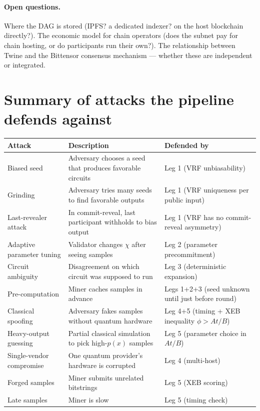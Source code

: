 \documentclass[11pt]{article}
\begin{document}
\paragraph{Open questions.} Where the DAG is stored (IPFS? a dedicated indexer? on the host blockchain directly?). The economic model for chain operators (does the subnet pay for chain hosting, or do participants run their own?). The relationship between Twine and the Bittensor consensus mechanism --- whether these are independent or integrated.

\section{Summary of attacks the pipeline defends against}

\begin{center}
\begin{tabular}{lp{4.5cm}p{6cm}}
\toprule
\textbf{Attack} & \textbf{Description} & \textbf{Defended by} \\
\midrule
Biased seed & Adversary chooses a seed that produces favorable circuits & Leg 1 (VRF unbiasability) \\
Grinding & Adversary tries many seeds to find favorable outputs & Leg 1 (VRF uniqueness per public input) \\
Last-revealer attack & In commit-reveal, last participant withholds to bias output & Leg 1 (VRF has no commit-reveal asymmetry) \\
Adaptive parameter tuning & Validator changes $\chi$ after seeing samples & Leg 2 (parameter precommitment) \\
Circuit ambiguity & Disagreement on which circuit was supposed to run & Leg 3 (deterministic expansion) \\
Pre-computation & Miner caches samples in advance & Legs 1+2+3 (seed unknown until just before round) \\
Classical spoofing & Adversary fakes samples without quantum hardware & Leg 4+5 (timing + XEB inequality $\phi > At/B$) \\
Heavy-output guessing & Partial classical simulation to pick high-$p(x)$ samples & Leg 5 (parameter choice in $A t / B$) \\
Single-vendor compromise & One quantum provider's hardware is corrupted & Leg 4 (multi-host) \\
Forged samples & Miner submits unrelated bitstrings & Leg 5 (XEB scoring) \\
Late samples & Miner is slow & Leg 5 (timing check) \\

\end{tabular}
\end{center}
\end{document}
